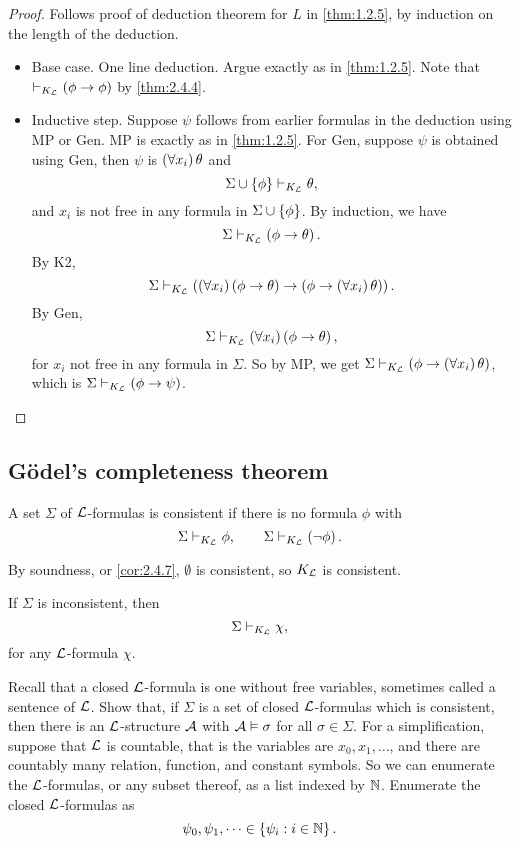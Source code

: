 \begin{proof}
Follows proof of deduction theorem for $ L $ in \ref{thm:1.2.5}, by induction on the length of the deduction.
\begin{itemize}
\item Base case. One line deduction. Argue exactly as in \ref{thm:1.2.5}. Note that $ \vdash_{K_{\LL}} \impb{\phi}{\phi} $ by \ref{thm:2.4.4}.
\item Inductive step. Suppose $ \psi $ follows from earlier formulas in the deduction using MP or Gen. MP is exactly as in \ref{thm:1.2.5}. For Gen, suppose $ \psi $ is obtained using Gen, then $ \psi $ is $ \fab{x_i}\theta $ and
$$ \Sigma \cup \cb{\phi} \vdash_{K_{\LL}} \theta, $$
and $ x_i $ is not free in any formula in $ \Sigma \cup \cb{\phi} $. By induction, we have
$$ \Sigma \vdash_{K_{\LL}} \impb{\phi}{\theta}. $$
By K2,
$$ \Sigma \vdash_{K_{\LL}} \impb{\fab{x_i}\impb{\phi}{\theta}}{\impb{\phi}{\fab{x_i}\theta}}. $$
By Gen,
$$ \Sigma \vdash_{K_{\LL}} \fab{x_i}\impb{\phi}{\theta}, $$
for $ x_i $ not free in any formula in $ \Sigma $. So by MP, we get $ \Sigma \vdash_{K_{\LL}} \impb{\phi}{\fab{x_i}\theta} $, which is $ \Sigma \vdash_{K_{\LL}} \impb{\phi}{\psi} $.
\end{itemize}
\end{proof}


\subsection{G\"odel's completeness theorem}

\begin{definition}
A set $ \Sigma $ of $ \LL $-formulas is consistent if there is no formula $ \phi $ with
$$ \Sigma \vdash_{K_{\LL}} \phi, \qquad \Sigma \vdash_{K_{\LL}} \notb{\phi}. $$
\end{definition}

By soundness, or \ref{cor:2.4.7}, $ \emptyset $ is consistent, so $ K_{\LL} $ is consistent.

\begin{remark*}
If $ \Sigma $ is inconsistent, then
$$ \Sigma \vdash_{K_{\LL}} \chi, $$
for any $ \LL $-formula $ \chi $.
\end{remark*}

Recall that a closed $ \LL $-formula is one without free variables, sometimes called a sentence of $ \LL $. Show that, if $ \Sigma $ is a set of closed $ \LL $-formulas which is consistent, then there is an $ \LL $-structure $ \AA $ with $ \AA \vDash \sigma $ for all $ \sigma \in \Sigma $. For a simplification, suppose that $ \LL $ is countable, that is the variables are $ x_0, x_1, \dots $, and there are countably many relation, function, and constant symbols. So we can enumerate the $ \LL $-formulas, or any subset thereof, as a list indexed by $ \N $. Enumerate the closed $ \LL $-formulas as
$$ \psi_0, \psi_1, \dots \in \cb{\psi_i : i \in \N}. $$

